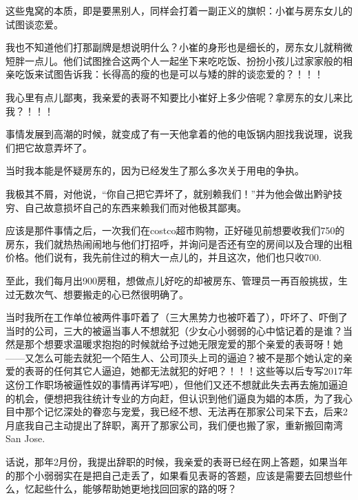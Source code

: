\documentclass[9pt, b5paper]{article}
\begin{document}
这些鬼窝的本质，即是要黑别人，同样会打着一副正义的旗帜：小崔与房东女儿的试图谈恋爱。

我也不知道他们打那副牌是想说明什么？小崔的身形也是细长的，房东女儿就稍微短胖一点儿。他们试图挫合这两个人一起坐下来吃吃饭、扮扮小孩儿过家家般的相亲吃饭来试图告诉我：长得高的瘦的也是可以与矮的胖的谈恋爱的？！！！

我心里有点儿鄙夷，我亲爱的表哥不知要比小崔好上多少倍呢？拿房东的女儿来比我？！！！

事情发展到高潮的时候，就变成了有一天他拿着的他的电饭锅内胆找我说理，说我们把它故意弄坏了。

当时我本能是怀疑房东的，因为已经发生了那么多次关于用电的争执。

我极其不屑，对他说，“你自己把它弄坏了，就别赖我们！”并为他会做出黔驴技穷、自己故意损坏自己的东西来赖我们而对他极其鄙夷。

应该是那件事情之后，一次我们在costco超市购物，正好碰见前想要收我们750的房东，我们就热热闹闹地与他们打招呼，并询问是否还有空的房间以及合理的出租价格。他们说有，我先前住过的稍大一点儿的，并且这次，他们也只收700.

至此，我们每月出900房租，想做点儿好吃的却被房东、管理员一再百般挑拔，生过无数次气、想要搬走的心已然很明确了。

当时我所在工作单位被两件事吓着了（三大黑势力也被吓着了），吓坏了、吓倒了当时的公司，三大的被逼当事人不想就犯（少女心小弱弱的心中惦记着的是谁？当然是那个想要求温暖求抱抱的时候就给予过她无限宠爱的那个亲爱的表哥呀！她——又怎么可能去就犯一个陌生人、公司顶头上司的逼迫？被不是那个她认定的亲爱的表哥的任何其它人逼迫，她都无法就犯的好吧？！！！这些等以后专写2017年这份工作职场被逼性奴的事情再详写吧），但他们又还不想就此失去再去施加逼迫的机会，便想把我往统计专业的方向赶，但认识到他们逼良为娼的本质，为了我心目中那个记忆深处的眷恋与宠爱，我已经不想、无法再在那家公司呆下去，后来2月底我自己主动提出了辞职，离开了那家公司，我们便也搬了家，重新搬回南湾San Jose.

话说，那年2月份，我提出辞职的时候，我亲爱的表哥已经在网上答题，如果当年的那个小弱弱实在是把自己走丢了，如果看见表哥的答题，应该是需要去回想些什么，忆起些什么，能够帮助她更地找回回家的路的呀？
\end{document}
